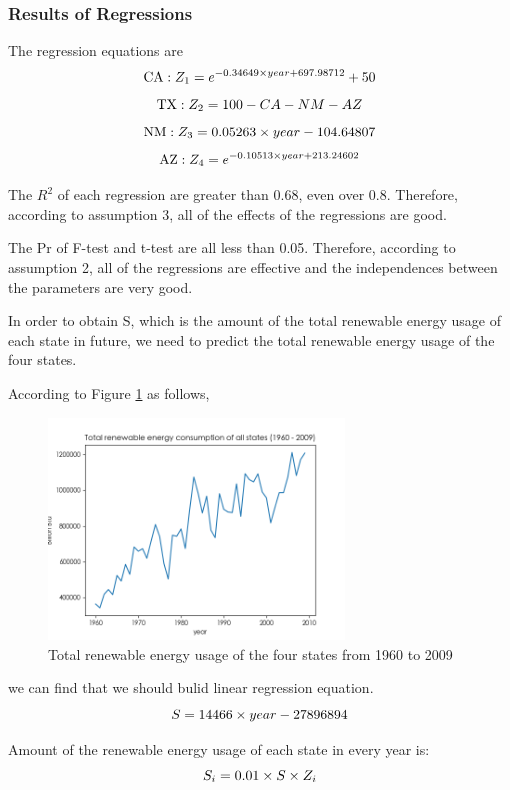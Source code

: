 \documentclass[a4paper,11pt]{article}
\begin{document}
\subsubsection{Results of Regressions}
\par The regression equations are
\begin{equation}
    \centering
\text{CA}:   Z_1=e^{-0.34649 \times year+697.98712}+50
\end{equation}
\begin{equation}
    \centering
\text{TX}:   Z_2=100-CA-NM-AZ
\end{equation}
\begin{equation}
    \centering
\text{NM}:   Z_3=0.05263 \times year-104.64807
\end{equation}
\begin{equation}
    \centering
\text{AZ}:   Z_4=e^{-0.10513 \times year+213.24602}
\end{equation}
\par The $R^{2}$ of each regression are greater than 0.68, even over 0.8. Therefore, according to assumption 3, all of the effects of the regressions are good.
\par The Pr of F-test and t-test are all less than 0.05. Therefore, according to assumption 2, all of the regressions are effective and the independences between the parameters are very good.
\par In order to obtain S, which is the amount of the total renewable energy usage of each state in future, we need to predict the total renewable energy usage of the four states.
\par According to Figure \ref{fig:D-total-energy} as follows,
\begin{figure}[h]%
    \centering 
    \includegraphics[width=0.7\textwidth]{./Pic/D-total-energy.png}
    \caption{Total renewable energy usage of the four states from 1960 to 2009}
    \label{fig:D-total-energy}  
\end{figure}
we can find that we should bulid linear regression equation.
\begin{equation}
    \centering
S=14466 \times year-27896894
\end{equation}
\par Amount of the renewable energy usage of each state in every year is:
\begin{equation}
    \centering
    S_i=0.01 \times S \times Z_i
\end{equation}
\end{document}
